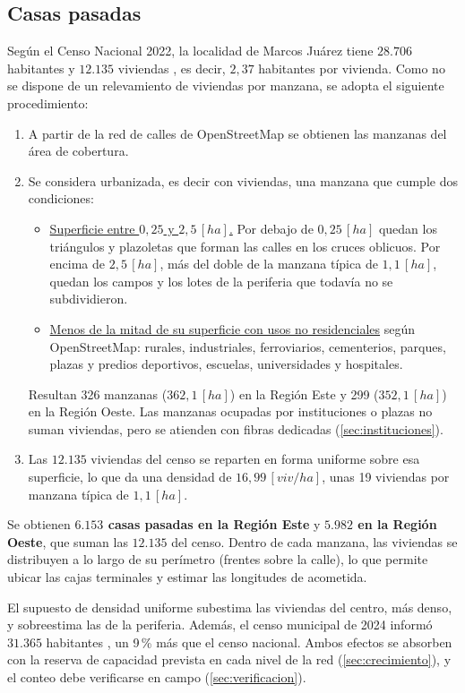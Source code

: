 \subsection{Casas pasadas}
\label{sec:casas}
Según el Censo Nacional 2022, la localidad de Marcos Juárez tiene $28.706$ habitantes y $12.135$ viviendas \cite{indec_censo}, es decir, $2{,}37$ habitantes por vivienda. Como no se dispone de un relevamiento de viviendas por manzana, se adopta el siguiente procedimiento:
\begin{enumerate}
    \item A partir de la red de calles de OpenStreetMap se obtienen las manzanas del área de cobertura.
    \item Se considera urbanizada, es decir con viviendas, una manzana que cumple dos condiciones:
    \begin{itemize}
        \item \underline{Superficie entre $0{,}25$ y $2{,}5 \, [ha]$.} Por debajo de $0{,}25 \, [ha]$ quedan los triángulos y plazoletas que forman las calles en los cruces oblicuos. Por encima de $2{,}5 \, [ha]$, más del doble de la manzana típica de $1{,}1 \, [ha]$, quedan los campos y los lotes de la periferia que todavía no se subdividieron.
        \item \underline{Menos de la mitad de su superficie con usos no residenciales} según OpenStreetMap: rurales, industriales, ferroviarios, cementerios, parques, plazas y predios deportivos, escuelas, universidades y hospitales.
    \end{itemize}
    Resultan 326 manzanas ($362{,}1 \, [ha]$) en la Región Este y 299 ($352{,}1 \, [ha]$) en la Región Oeste. Las manzanas ocupadas por instituciones o plazas no suman viviendas, pero se atienden con fibras dedicadas (\autoref{sec:instituciones}).
    \item Las $12.135$ viviendas del censo se reparten en forma uniforme sobre esa superficie, lo que da una densidad de $16{,}99 \, [viv/ha]$, unas 19 viviendas por manzana típica de $1{,}1 \, [ha]$.
\end{enumerate}

Se obtienen \textbf{$6.153$ casas pasadas en la Región Este} y \textbf{$5.982$ en la Región Oeste}, que suman las $12.135$ del censo. Dentro de cada manzana, las viviendas se distribuyen a lo largo de su perímetro (frentes sobre la calle), lo que permite ubicar las cajas terminales y estimar las longitudes de acometida.

El supuesto de densidad uniforme subestima las viviendas del centro, más denso, y sobreestima las de la periferia. Además, el censo municipal de 2024 informó $31.365$ habitantes \cite{indec_censo}, un 9\,\% más que el censo nacional. Ambos efectos se absorben con la reserva de capacidad prevista en cada nivel de la red (\autoref{sec:crecimiento}), y el conteo debe verificarse en campo (\autoref{sec:verificacion}).

